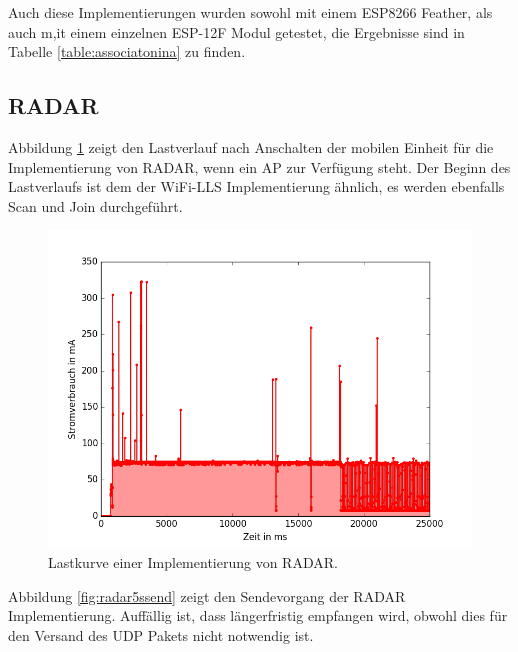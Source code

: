 Auch diese Implementierungen wurden sowohl mit einem ESP8266 Feather, als auch m,it einem einzelnen ESP-12F Modul getestet, die Ergebnisse sind in Tabelle \ref{table:associatonina} zu finden.

\subsection{RADAR}
Abbildung \ref{fig:radar5s} zeigt den Lastverlauf nach Anschalten der mobilen Einheit für die Implementierung von RADAR, wenn ein AP zur Verfügung steht. 
Der Beginn des Lastverlaufs ist dem der WiFi-LLS Implementierung ähnlich, es werden ebenfalls Scan und Join durchgeführt.\\

\begin{figure}[h!]
  \centering
	\includegraphics[width=\textwidth]{plots/radar5s.png}
  \caption{Lastkurve einer Implementierung von RADAR.}
  \label{fig:radar5s}
\end{figure}

Abbildung \ref{fig:radar5ssend} zeigt den Sendevorgang der RADAR Implementierung.
Auffällig ist, dass längerfristig empfangen wird, obwohl dies für den Versand des UDP Pakets nicht notwendig ist.\\


